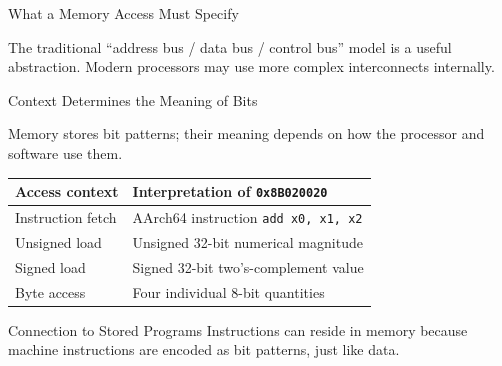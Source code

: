 \documentclass[aspectratio=169,11pt,t]{beamer}
\newcommand{\code}[1]{\texttt{#1}}
\begin{document}
\begin{frame}{What a Memory Access Must Specify}
\vspace{0cm}

\small

The traditional
``address bus / data bus / control bus''
model is a useful abstraction.
Modern processors may use
more complex interconnects internally.

\end{frame}




\begin{frame}{Context Determines the Meaning of Bits}

\small

Memory stores bit patterns;
their meaning depends on
how the processor
and software use them.

\vspace{0.2cm}

\begin{center}

\begin{tabular}{
  p{3.8cm}
  p{7.5cm}
}

\toprule

\textbf{Access context}
&
\textbf{Interpretation of \code{0x8B020020}}
\\

\midrule

Instruction fetch
&
AArch64 instruction
\code{add x0, x1, x2}
\\

Unsigned load
&
Unsigned 32-bit numerical magnitude
\\

Signed load
&
Signed 32-bit two's-complement value
\\

Byte access
&
Four individual 8-bit quantities
\\

\bottomrule

\end{tabular}

\end{center}

\vspace{0.25cm}

\begin{block}{Connection to Stored Programs}
Instructions can reside in memory
because machine instructions
are encoded as bit patterns,
just like data.
\end{block}

\end{frame}
\end{document}
